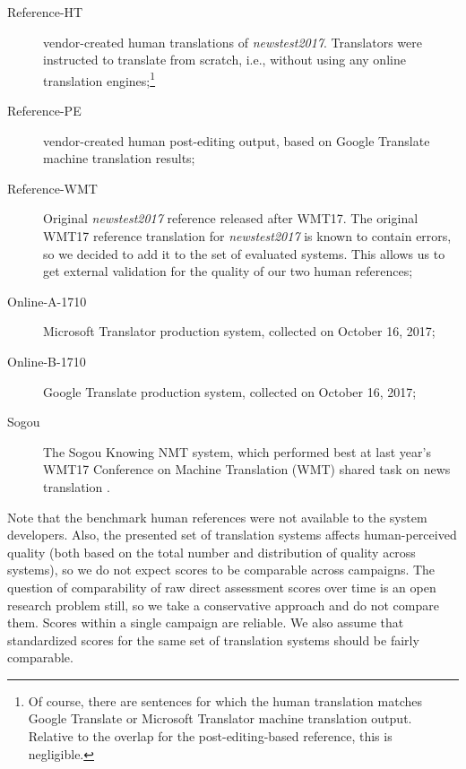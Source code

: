 \documentclass[a4paper]{article}
\begin{document}
\begin{CJK*}{UTF8}{gbsn}
\begin{description}
\item[Reference-HT] vendor-created human translations of \emph{newstest2017}. Translators were instructed to translate from scratch, i.e., without using any online translation engines;\footnote{Of course, there are sentences for which the human translation matches Google Translate or Microsoft Translator machine translation output. Relative to the overlap for the post-editing-based reference, this is negligible.}

\item[Reference-PE] vendor-created human post-editing output, based on Google Translate machine translation results;

\item[Reference-WMT] Original \emph{newstest2017} reference released after WMT17. The original WMT17 reference translation for \emph{newstest2017} is known to contain errors, so we decided to add it to the set of evaluated systems. This allows us to get external validation for the quality of our two human references;

\item[Online-A-1710] Microsoft Translator production system, collected on October 16, 2017;

\item[Online-B-1710] Google Translate production system, collected on October 16, 2017;

\item[Sogou] The Sogou Knowing NMT system, which performed best at last year's WMT17 Conference on Machine Translation (WMT) shared task on news translation \cite{Sogou}.
\end{description}

Note that the benchmark human references were not available to the system developers.
Also, the presented set of translation systems affects human-perceived quality (both based on the total number and distribution of quality across systems), so we do not expect scores to be comparable across campaigns. The question of comparability of raw direct assessment scores over time is an open research problem still, so we take a conservative approach and do not compare them. Scores within a single campaign are reliable. We also assume that standardized scores for the same set of translation systems should be fairly comparable.




















\end{CJK*}
\end{document}
